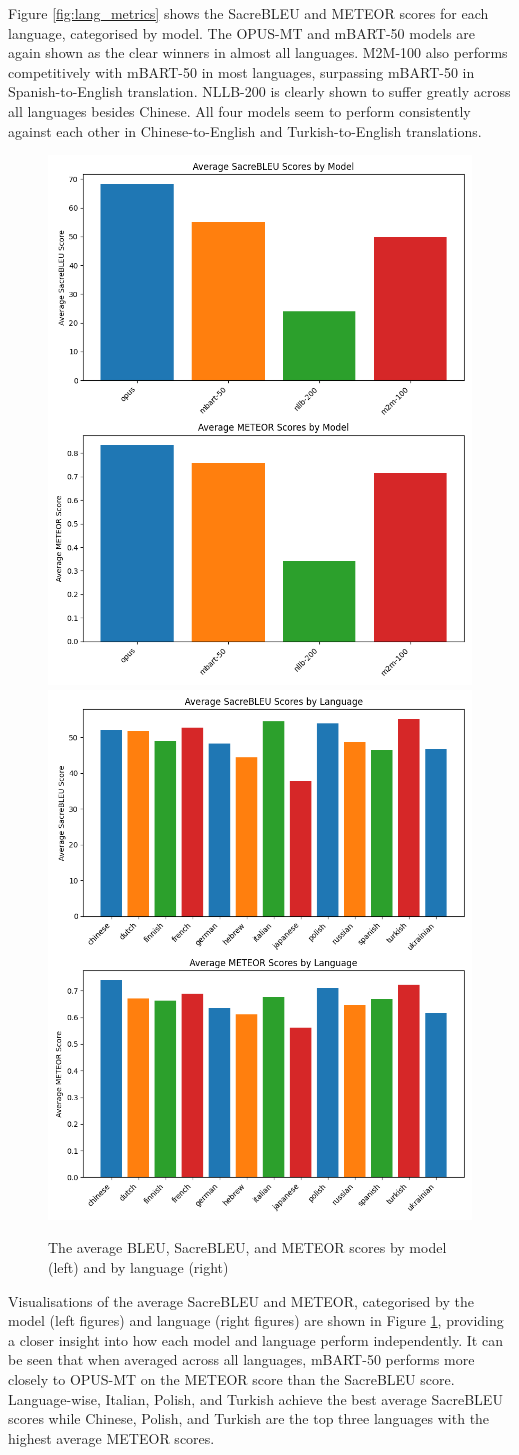 \documentclass[a4paper, 11pt]{article}
\begin{document}
Figure \ref{fig:lang_metrics} shows the SacreBLEU and METEOR scores for each language, categorised by model. The OPUS-MT and mBART-50 models are again shown as the clear winners in almost all languages. M2M-100 also performs competitively with mBART-50 in most languages, surpassing mBART-50 in Spanish-to-English translation. NLLB-200 is clearly shown to suffer greatly across all languages besides Chinese. All four models seem to perform consistently against each other in Chinese-to-English and Turkish-to-English translations.

\begin{figure}[htbp]
    \centering
    \includegraphics[width=0.49\linewidth]{figures/average_metrics_bar.png}
    \includegraphics[width=0.49\linewidth]{figures/average_metrics_lang_bar.png}
    \caption{The average BLEU, SacreBLEU, and METEOR scores by model (left) and by language (right)}
    \label{fig:average_bars}
\end{figure}

Visualisations of the average SacreBLEU and METEOR, categorised by the model (left figures) and language (right figures) are shown in Figure \ref{fig:average_bars}, providing a closer insight into how each model and language perform independently. It can be seen that when averaged across all languages, mBART-50 performs more closely to OPUS-MT on the METEOR score than the SacreBLEU score. Language-wise, Italian, Polish, and Turkish achieve the best average SacreBLEU scores while Chinese, Polish, and Turkish are the top three languages with the highest average METEOR scores.
\end{document}
